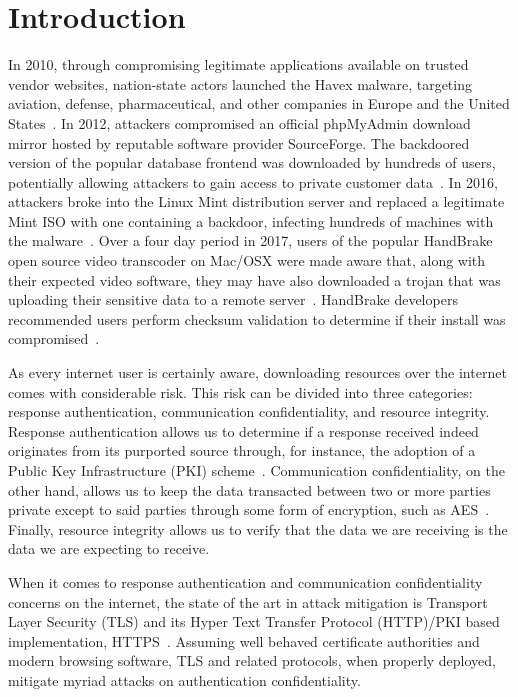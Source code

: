 \section{Introduction} \label{sec:introduction}

In 2010, through compromising legitimate applications available on trusted
vendor websites, nation-state actors launched the Havex malware, targeting
aviation, defense, pharmaceutical, and other companies in Europe and the United
States~\cite{SCA-HAVEX1, SCA-HAVEX2}. In 2012, attackers compromised an official
phpMyAdmin download mirror hosted by reputable software provider SourceForge.
The backdoored version of the popular database frontend was downloaded by
hundreds of users, potentially allowing attackers to gain access to private
customer data~\cite{SCA-PMA1, SCA-PMA2}. In 2016, attackers broke into the Linux
Mint distribution server and replaced a legitimate Mint ISO with one containing
a backdoor, infecting hundreds of machines with the malware~\cite{SCA-MINT1,
SCA-MINT2}. Over a four day period in 2017, users of the popular HandBrake open
source video transcoder on Mac/OSX were made aware that, along with their
expected video software, they may have also downloaded a trojan that was
uploading their sensitive data to a remote server~\cite{SCA-HB1}. HandBrake
developers recommended users perform checksum validation to determine if their
install was compromised~\cite{SCA-HB2}.

As every internet user is certainly aware, downloading resources over the
internet comes with considerable risk. This risk can be divided into three
categories: response authentication, communication confidentiality, and resource
integrity. Response authentication allows us to determine if a response received
indeed originates from its purported source through,
for instance, the adoption of a Public Key Infrastructure (PKI)
scheme~\cite{PKI}. Communication confidentiality, on the other hand, allows us
to keep the data transacted between two or more parties private except to said
parties through some form of encryption, such as
AES~\cite{AES}. Finally, resource integrity allows us to verify that the data we
are receiving is the data we are expecting to receive.

When it comes to response authentication and communication confidentiality
concerns on the internet, the state of the art in attack mitigation is Transport
Layer Security (TLS) and its Hyper Text Transfer Protocol (HTTP)/PKI based
implementation, HTTPS~\cite{TLS1.2, TLS1, TLS0, HTTPS, PKI}. Assuming well
behaved certificate authorities and modern browsing software, TLS and related
protocols, when properly deployed, mitigate myriad attacks on authentication
confidentiality.

